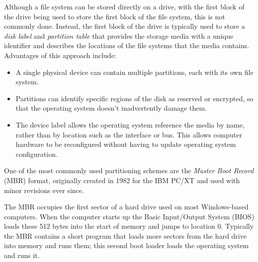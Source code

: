 Although a file system can be stored directly on a drive, with the
first block of the drive being used to store the first block of the
file system, this is not commonly done. Instead, the first 
block of the drive is typically used to store a \emph{disk label} and  \emph{partition
  table} that provides the storage media with a unique identifier and describes the
locations of the file systems that the media contains. Advantages of
this approach include:
\begin{itemize}
\item A single physical device can contain multiple partitions, each
  with its own file system.
\item Partitions can identify specific regions of the disk as reserved
  or encrypted, so that the operating system doesn't inadvertently
  damage them.
\item The device label allows the operating system reference the media
  by name, rather than by location such as the interface or bus. This
  allows computer hardware to be reconfigured without having to update
  operating system configuration.
\end{itemize}

One of the most commonly used partitioning schemes are the
\emph{Master Boot Record} (MBR) format, originally created in 1982 for
the IBM PC/XT and used with minor revisions ever since.

The MBR occupies the first sector of a hard drive used on most
Windows-based computers. When the computer starts up the Basic
Input/Output System (BIOS) loads these 512 bytes into the start of
memory and jumps to location 0. Typically the MBR contains a short
program that loads more sectors from the hard drive into memory and
runs them; this second boot loader loads the operating system and runs
it.

